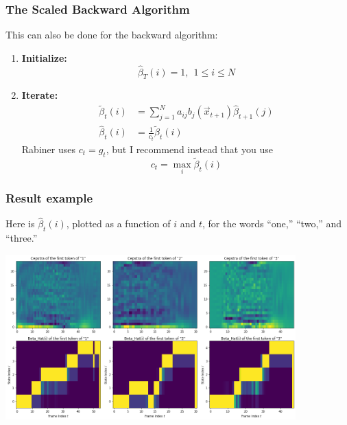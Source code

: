 \documentclass{beamer}
\begin{document}
%
%
%

\begin{frame}
  \frametitle{The Scaled Backward Algorithm}

  This can also be done for the backward algorithm:
  \begin{enumerate}
  \item {\bf Initialize:}
    \[
    \hat\beta_T(i) = 1,~~1\le i\le N
    \]
  \item {\bf Iterate:}
    \begin{align*}
      \tilde\beta_{t}(i) &= \sum_{j=1}^N a_{ij}b_j(\vec{x}_{t+1})\hat\beta_{t+1}(j)\\
      \hat\beta_t(i) &= \frac{1}{c_t}\tilde\beta_t(i)
    \end{align*}
    Rabiner uses $c_t=g_t$, but I recommend instead that you use
    \begin{displaymath}
      c_t = \max_i\tilde\beta_t(i)
    \end{displaymath}
  \end{enumerate}
\end{frame}

\begin{frame}
  \frametitle{Result example}

  Here is $\hat\beta_t(i)$, plotted as a function of $i$ and $t$, for
  the words ``one,'' ``two,'' and ``three.''
  \centerline{\includegraphics[height=2.5in]{beta_hat.png}}
\end{frame}
\end{document}
